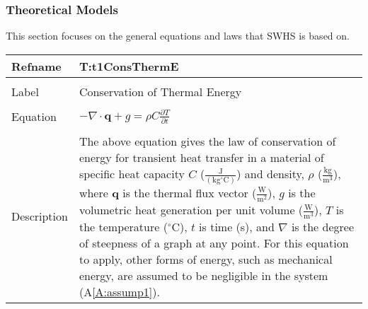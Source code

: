 \documentclass[12pt]{article}
\begin{document}
\subsubsection{Theoretical Models}
\label{Sec:TMs}
This section focuses on the general equations and laws that SWHS is based on.
~\newline
\noindent \begin{minipage}{\textwidth}
\begin{tabular}{p{} p{}}
\toprule \textbf{Refname} & \textbf{T:t1ConsThermE}
\label{T:t1ConsThermE}
\\ \midrule \\
Label & Conservation of Thermal Energy
\\ \midrule \\
Equation & $-\nabla{}\cdot{}\mathbf{q}+g=\rho{} C \frac{\partial{} T}{\partial{} t}$
\\ \midrule \\
Description & The above equation gives the law of conservation of energy for transient heat transfer in a material of specific heat capacity $C$ ($\frac{\text{J}}{(\text{kg}{}^{\circ}\text{C})}$) and density, $\rho{}$ ($\frac{\text{kg}}{\text{m}^{3}}$), where $\mathbf{q}$ is the thermal flux vector ($\frac{\text{W}}{\text{m}^{2}}$), $g$ is the volumetric heat generation per unit volume ($\frac{\text{W}}{\text{m}^{3}}$), $T$ is the temperature (${}^{\circ}$C), $t$ is time (s), and $\nabla{}$ is the degree of steepness of a graph at any point. For this equation to apply, other forms of energy, such as mechanical energy, are assumed to be negligible in the system (A\ref{A:assump1}).
\\ \bottomrule \end{tabular}
\end{minipage}\\
~\newline
\end{document}
